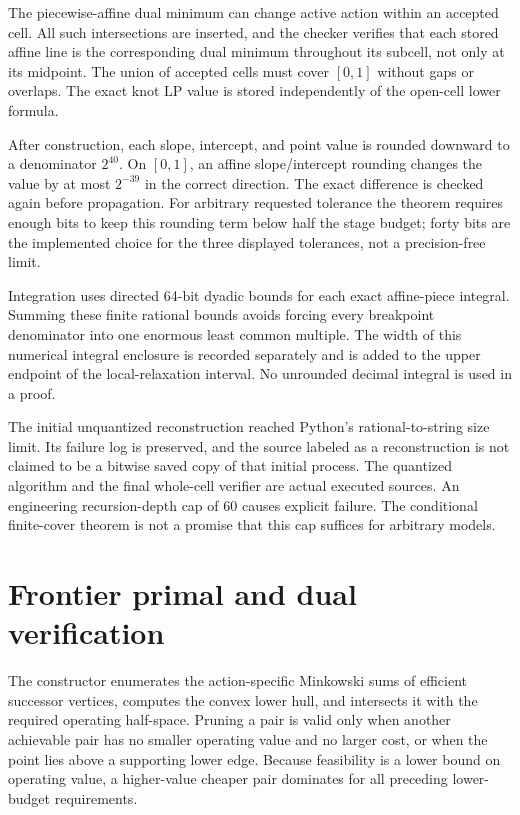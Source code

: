The piecewise-affine dual minimum can change active action within an accepted cell. All such intersections are inserted, and the checker verifies that each stored affine line is the corresponding dual minimum throughout its subcell, not only at its midpoint. The union of accepted cells must cover $[0,1]$ without gaps or overlaps. The exact knot LP value is stored independently of the open-cell lower formula.

After construction, each slope, intercept, and point value is rounded downward to a denominator $2^{40}$. On $[0,1]$, an affine slope/intercept rounding changes the value by at most $2^{-39}$ in the correct direction. The exact difference is checked again before propagation. For arbitrary requested tolerance the theorem requires enough bits to keep this rounding term below half the stage budget; forty bits are the implemented choice for the three displayed tolerances, not a precision-free limit.

Integration uses directed 64-bit dyadic bounds for each exact affine-piece integral. Summing these finite rational bounds avoids forcing every breakpoint denominator into one enormous least common multiple. The width of this numerical integral enclosure is recorded separately and is added to the upper endpoint of the local-relaxation interval. No unrounded decimal integral is used in a proof.

The initial unquantized reconstruction reached Python's rational-to-string size limit. Its failure log is preserved, and the source labeled as a reconstruction is not claimed to be a bitwise saved copy of that initial process. The quantized algorithm and the final whole-cell verifier are actual executed sources. An engineering recursion-depth cap of 60 causes explicit failure. The conditional finite-cover theorem is not a promise that this cap suffices for arbitrary models.

\section{Frontier primal and dual verification}
The constructor enumerates the action-specific Minkowski sums of efficient successor vertices, computes the convex lower hull, and intersects it with the required operating half-space. Pruning a pair is valid only when another achievable pair has no smaller operating value and no larger cost, or when the point lies above a supporting lower edge. Because feasibility is a lower bound on operating value, a higher-value cheaper pair dominates for all preceding lower-budget requirements.

